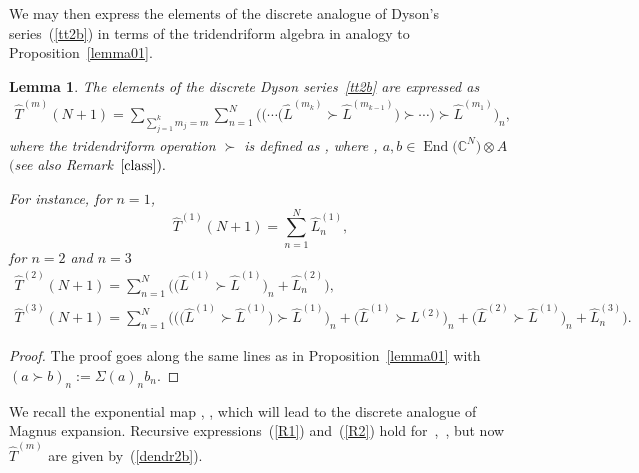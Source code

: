 \documentclass[10pt,a4paper]{amsart}
\numberwithin{equation}{section}
\newtheorem{lem}[thm]{Lemma}
\theoremstyle{definition}
\DeclareMathOperator{\EEnd}{End}%
\def\mathfrak#1{#1}%
\def\mathcal#1{#1}%
\begin{document}
We may then express the elements of the discrete analogue of Dyson's series~(\ref{tt2b}) in terms of the
tridendriform algebra in analogy to Proposition~\ref{lemma01}.
{\begin{lem}{\label{lemmahat}}
The elements of the discrete Dyson series~\eqref{tt2b} are expressed as
\begin{eqnarray}
\hat T^{(m)}(N+1) = \sum_{\sum_{j=1}^km_j=m}\sum_{n=1}^N \bigl( \bigl(\cdots \bigl( \hat L^{(m_k)}\succ \hat L^{(m_{k-1})}\bigr) \succ \cdots \bigr)\succ \hat L^{(m_1)}\bigr)_n , \label{dendr2b}
\end{eqnarray}
where the tridendriform operation $\succ$ is defined as
, where , $a, b \in \EEnd\bigl({\mathbb C}^{\mathcal N}\bigr) \otimes{\mathfrak A}$ $($see also Remark~$\ref{class}).$

For instance, for $n=1$,
\[
\hat T^{(1)}(N+1)= \sum_{n=1}^N \hat L^{(1)}_n,
\]
 for $n=2$ and $n=3$
\begin{gather*}
\hat T^{(2)}(N+1) =
 \sum_{n=1}^N \bigl( \bigl(\hat L^{(1)} \succ \hat L^{(1)}\bigr)_n + \hat L_n^{(2)}\bigr),\\
\hat T^{(3)}(N+1)= \sum_{n=1}^N \bigl( \bigl(\bigl(\hat L^{(1)} \succ \hat L^{(1)}\bigr)\succ \hat L^{(1)}\bigr)_n +
\bigl(\hat L^{(1)}\succ L^{(2)} \bigr)_n + \bigl(\hat L^{(2)} \succ \hat L^{(1)}\bigr)_n + \hat L_n^{(3)}\bigr).
\end{gather*}
\end{lem}
\begin{proof} The proof goes along the same lines as in Proposition~\ref{lemma01} with $(a\succ b)_n := \Sigma(a)_n b_n$.
\end{proof}}

We recall the exponential map \smash{$\hat T(\alpha) = {\rm e}^{\hat {\mathcal Q}(\alpha)}$},
\smash{$\hat {\mathcal Q}(\alpha) = \sum_{m=1}^{\infty}\alpha^m \hat {\mathcal Q}^{(m)}$},
which will lead to the discrete analogue of Magnus expansion.
{Recursive expressions~(\ref{R1}) and~(\ref{R2}) hold for~,~\smash{$\hat {\mathcal Q}^{{m}}$}, but now $\hat T^{(m)}$ are given by~(\ref{dendr2b}).}
\end{document}
